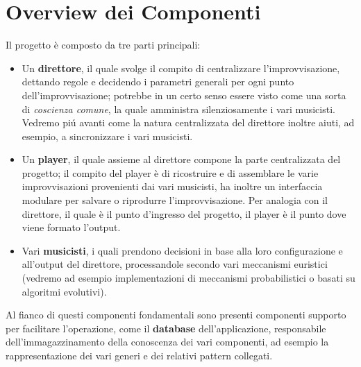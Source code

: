 \section{Overview dei Componenti}
Il progetto \`e composto da tre parti principali:\\
\begin{itemize}
\item Un \textbf{direttore}, il quale svolge il compito di centralizzare l'improvvisazione,
dettando regole e decidendo i parametri generali per ogni punto dell'improvvisazione;
potrebbe in un certo senso essere visto come una sorta di \emph{coscienza comune},
la quale amministra silenziosamente i vari musicisti. Vedremo pi\'u avanti come
la natura centralizzata del direttore inoltre aiuti, ad esempio, a sincronizzare
i vari musicisti.\\
\item Un \textbf{player}, il quale assieme al direttore compone la parte centralizzata
del progetto; il compito del player \`e di ricostruire e di assemblare le varie
improvvisazioni provenienti dai vari musicisti, ha inoltre un interfaccia
modulare per salvare o riprodurre l'improvvisazione. Per analogia con il direttore,
il quale \`e il punto d'ingresso del progetto, il player \`e il punto dove viene
formato l'output.\\
\item Vari \textbf{musicisti}, i quali prendono decisioni in base alla loro configurazione
e all'output del direttore, processandole secondo vari meccanismi euristici
(vedremo ad esempio implementazioni di meccanismi probabilistici o basati su algoritmi evolutivi).\\
\end{itemize}
Al fianco di questi componenti fondamentali sono presenti componenti supporto
per facilitare l'operazione, come il \textbf{database} dell'applicazione,
responsabile dell'immagazzinamento della conoscenza dei vari componenti, ad
esempio la rappresentazione dei vari generi e dei relativi pattern collegati.